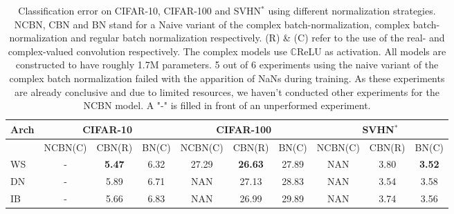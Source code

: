 \documentclass{article}
\begin{document}
\begin{table}[t]
\vskip 0.15in
\begin{center}
\caption{Classification error on CIFAR-10, CIFAR-100 and SVHN$^*$ using different normalization strategies. NCBN, CBN and BN stand for a Naive variant of the complex batch-normalization, complex batch-normalization and regular batch normalization respectively. (R) \& (C) refer to the use of the real- and complex-valued convolution respectively. The complex models use $\mathbb{C}$ReLU as activation. All models are constructed to have roughly 1.7M parameters. 5 out of 6 experiments using the naive variant of the complex batch normalization failed with the apparition of NaNs during training. As these experiments are already conclusive and due to limited resources, we haven't conducted other experiments for the NCBN model. A "-" is filled in front of an unperformed experiment.}
\label{results_ablation}
\begin{small}
\begin{sc}
\begin{tabular}{l|ccc|ccc|ccc}
\toprule
Arch & \multicolumn{3}{c|}{CIFAR-10} & \multicolumn{3}{c|}{CIFAR-100} & \multicolumn{3}{c}{SVHN$^*$} \\
\midrule
& \hspace{-1mm} NCBN(C) & \hspace{-4mm} CBN(R) \hspace{-4mm} & BN(C) & NCBN(C) & \hspace{-4mm} CBN(R) \hspace{-4mm} & BN(C) & NCBN(C) & \hspace{-4mm} CBN(R) \hspace{-4mm} & BN(C) \\
\midrule
WS & - & \textbf{5.47} & 6.32 & 27.29 & \textbf{26.63} & 27.89 & NAN & 3.80 & \textbf{3.52} \\
DN & - & 5.89 & 6.71 & NAN & 27.13 & 28.83 & NAN & 3.54 & 3.58 \\
IB & - & 5.66 & 6.83 & NAN & 26.99 & 29.89 & NAN & 3.74 & 3.56 \\
\bottomrule
\end{tabular}
\end{sc}
\end{small}
\end{center}
\vskip -0.1in
\end{table}
\end{document}
